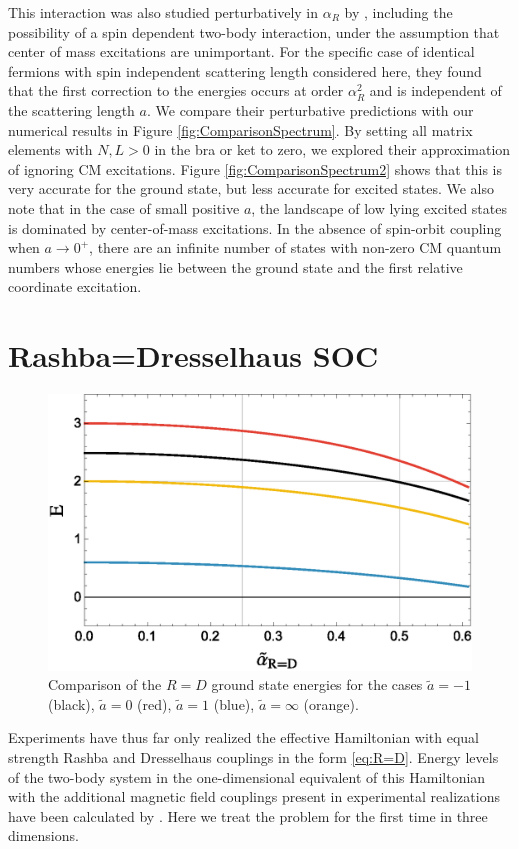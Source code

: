 \documentclass[%
 preprint,
 amsmath,amssymb,
 aps,
]{revtex4-1}
\begin{document}
This interaction was also studied perturbatively in $\alpha_R$ by \cite{PhysRevA.89.033606}, including the possibility of a spin dependent two-body interaction, under the assumption that center of mass excitations are unimportant. For the specific case of identical fermions with spin independent scattering length considered here, they found that the first correction to the energies occurs at order $\alpha_R^2$ and is independent of the scattering length $a$. We compare their perturbative predictions with our numerical results in Figure \ref{fig:ComparisonSpectrum}. By setting all matrix elements with $N,L>0$ in the bra or ket to zero, we explored their approximation of ignoring CM excitations. Figure \ref{fig:ComparisonSpectrum2} shows that this is very accurate for the ground state, but less accurate for excited states. We also note that in the case of small positive $a$, the landscape of low lying excited states is dominated by center-of-mass excitations. In the absence of spin-orbit coupling when $a\rightarrow0^+$, there are an infinite number of states with non-zero CM quantum numbers whose energies lie between the ground state and the first relative coordinate excitation.


\section{\label{sec:R=D}Rashba=Dresselhaus SOC}

\begin{figure}
\includegraphics[width=0.65\linewidth]{Figures/R=D_GS}
\caption{\label{fig:R=D_Ground_States} Comparison of the $R=D$ ground state energies for the cases $\tilde{a}=-1$ (black), $\tilde{a}=0$ (red), $\tilde{a}=1$ (blue), $\tilde{a}=\infty$ (orange).} 
\end{figure}

Experiments have thus far only realized the effective Hamiltonian with equal strength Rashba and Dresselhaus couplings in the form \eqref{eq:R=D}. Energy levels of the two-body system in the one-dimensional equivalent of this Hamiltonian with the additional magnetic field couplings present in experimental realizations have been calculated by \cite{guan2014energy}. Here we treat the problem for the first time in three dimensions.
\end{document}
